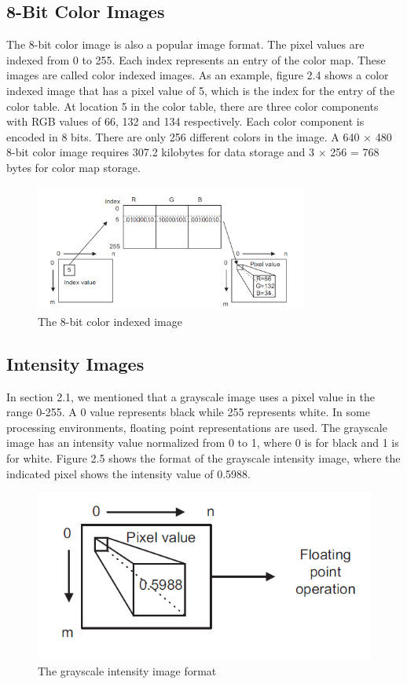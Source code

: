 \subsection{8-Bit Color Images}
The 8-bit color image is also a popular image format. The pixel 
values are indexed from 0 to 255. Each index represents an entry of the 
color map. These images are called color indexed images. As an example, figure 2.4 shows 
a color indexed image that has a pixel value of 5, which is the index for the entry of 
the color table. At location 5 in the color table, there are three color components with 
RGB values of 66, 132 and 134 respectively. Each color component is encoded in 8 bits. There are 
only 256 different colors in the image. A 640 $\times$ 480 8-bit color image requires 307.2 kilobytes 
for data storage and 3 $\times$ 256 = 768 bytes for color map storage.

\begin{figure}[H]
	\centering
	\includegraphics[width=0.80\textwidth]{CHAPTERS/Chapter-2/Images/2.4.png}
	\caption{The 8-bit color indexed image}
	\label{fig:2.4}
\end{figure}

\subsection{Intensity Images}
In section 2.1, we mentioned that a grayscale image uses a 
pixel value in the range 0-255. A 0 value represents black while 255 
represents white. In some processing environments, floating point representations 
are used. The grayscale image has an intensity value normalized from 0 to 1, where 0 is 
for black and 1 is for white. Figure 2.5 shows the format of the grayscale intensity 
image, where the indicated pixel shows the intensity value of 0.5988.

\begin{figure}[H]
	\centering
	\includegraphics[scale = 0.75]{CHAPTERS/Chapter-2/Images/2.5.png}
	\caption{The grayscale intensity image format}
	\label{fig:2.5}
\end{figure}

